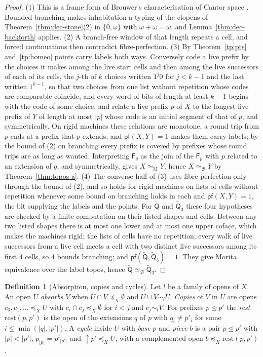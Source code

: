 \documentclass{lmcs}
\theoremstyle{definition}
\newtheorem{definition}[theorem]{Definition}
\theoremstyle{remark}
\newcommand{\dimn}[1]{\lvert #1\rvert}
\newcommand{\ext}{\trianglelefteq}
\newcommand{\fle}[1]{\preceq_{#1}}
\newcommand{\upc}[1]{{\uparrow}#1}
\newcommand{\fat}[1]{\mathsf{F}_{#1}}
\newcommand{\eqM}{\simeq_{\mathrm{M}}}
\providecommand{\tyl}[1]{\sim_{#1}}
\providecommand{\rest}{\mathrm{rest}}
\providecommand{\eqB}{\simeq_{\mathcal{B}}}
\providecommand{\pfB}{\mathsf{pf}}
\providecommand{\wQt}{\tilde{\mathsf{Q}}}
\providecommand{\wQtt}{\tilde{\mathsf{Q}}_3}
\begin{document}
\begin{proof}
(1) This is a frame form of Brouwer's characterisation of Cantor space \cite{Brouwer10}. Bounded branching makes inhabitation a typing of the clopens of Theorem~\ref{thm:dec-stone}(2) in
$\{0,\omega\}$ with $\omega+\omega=\omega$, and Lemma~\ref{thm:dec-backforth} applies. (2) A
branch-free window of that length repeats a cell, and forced continuations then contradict fibre-perfection. (3)
By Theorem~\ref{tp:pts} and~\ref{tp:homeo} points carry labels both
ways. Conversely code a live
prefix by the choices it makes among the live start cells and then among the live successors of each of its cells,
the $j$-th of $k$ choices written $1^j0$ for $j<k-1$ and the last written $1^{k-1}$, so that two choices from one list without repetition whose codes are comparable coincide, and every word of bits
of length at least $k-1$ begins with the code of some choice, and relate a live prefix $p$ of $X$ to the longest live prefix of $Y$ of
length at most $\dimn{p}$ whose code is an initial segment of that of $p$, and symmetrically. On
rigid machines these relations are monotone, a round trip from $p$ ends at a prefix that $p$ extends, and $\pfB(X,Y)=1$ makes
them carry labels;
by the bound of (2) on branching every prefix is covered by prefixes whose round trips are as long as
wanted. Interpreting $\fat{q}$ as the join of the $\fat{p}$ with
$p$ related to an extension of $q$, and symmetrically, gives $X\eqM Y$, hence $X\eqB Y$ by
Theorem~\ref{thm:topos-a}.
(4) The converse half of (3) uses fibre-perfection only through the bound of (2), and so holds for rigid machines
on lists of cells without repetition whenever some bound on branching holds in each and $\pfB(X,Y)=1$, the bit
supplying the labels and the points. For $\wQt$ and $\wQtt$ these four hypotheses are
checked by a finite computation on their listed shapes and cells. Between any two listed shapes there is at most one
lower and at most one upper coface, which makes the machines rigid; the lists of cells
have no repetition; every walk of live successors from a live cell meets a cell with two
distinct live successors among its first $4$ cells, so $4$ bounds branching; and
$\pfB(\wQt,\wQtt)=1$. They give Morita equivalence over the
label topos, hence $\wQt\eqB\wQtt$.
\end{proof}

\begin{definition}[Absorption, copies and cycles]\label{def:absorb}\label{def:absorb-cycle}
Let $l$ be a family of opens of $X$. An open $U$ \emph{absorbs} $V$ when $U\cap V\fle{X}\emptyset$ and $U\cup V\tyl{l}U$.
\emph{Copies} of $V$ in $U$ are opens $c_0,c_1,\dots\fle{X}U$ with $c_i\cap c_j\fle{X}\emptyset$ for $i<j$ and $c_j\tyl{l}V$.
For prefixes $p\ext p'$ the \emph{rest} $\rest(p,p')$ is the open of the extensions $q$ of $p$ with $q_i\neq p'_i$ for some
$i\leq\min(\dimn{q},\dimn{p'})$. A \emph{cycle} inside $U$ with \emph{base} $p$ and \emph{piece} $b$ is a pair $p\ext p'$ with
$\dimn{p}<\dimn{p'}$, $p_{\dimn{p}}=p'_{\dimn{p'}}$ and $\upc{p'}\fle{X}U$, with a complemented open
$b\fle{X}\rest(p,p')$.
\end{definition}
\end{document}
